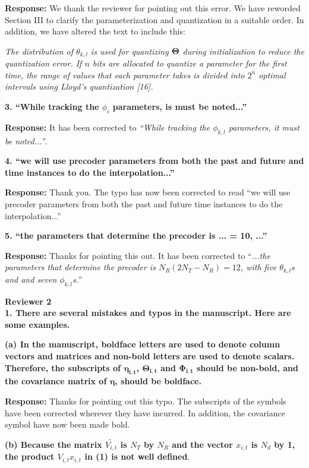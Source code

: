 \documentclass[12pt]{letter}
\begin{document}
\textbf{Response:} We thank the reviewer for pointing out this
error. We have reworded Section III to clarify the parameterization and quantization
in a suitable order. In addition, we have altered the text to include this:

\emph{The distribution of $\theta_{k,l}$ is used for
quantizing $\bf{\Theta}$ during initialization to reduce the
quantization error.  If $n$ bits are allocated to quantize a
parameter for the first time, the range of values that each parameter
takes is divided into $2^n$ optimal intervals using Lloyd's
quantization [16].}

\textbf{3. ``While tracking the $\phi_i$ parameters, is must be noted...''}

\textbf{Response:} It has been corrected to \emph{``While tracking the $\phi_{k,l}$ parameters, it must be noted...''}.

\textbf{4. ``we will use precoder parameters from both the past and future and
time instances to do the interpolation...''}

\textbf{Response:} Thank you. The typo has now been corrected to read
``we will use precoder parameters from both the past and future time instances to do the interpolation...''

\textbf{5. ``the parameters that determine the precoder is ...  = 10, ...''}

\textbf{Response:} Thanks for pointing this out. It has been corrected to ``\emph{...the parameters that determine the precoder is
$N_{R}(2N_{T} - N_R) = 12$, with five $\theta_{k,l}$s and and seven
$\phi_{k,l}$s.}''

\textbf{Reviewer 2}\\

\textbf{1. There are several mistakes and typos in the manuscript. Here are some examples.}

\textbf{(a) In the manuscript, boldface letters are used to denote column vectors and matrices and non-bold letters are used to denote scalars. Therefore, the subscripts of $\boldsymbol{\eta_{i,t}}$, $\boldsymbol{\Theta_{i,t}}$ and $\boldsymbol{\Phi_{i,t}}$ should be non-bold, and the covariance matrix of $\boldsymbol{\eta}$, should be boldface.}

\textbf{Response:} Thanks for pointing out this typo. The subscripts
of the symbols have been corrected wherever they have incurred. In addition,
the covariance symbol have now been made bold.

\textbf{(b) Because the matrix $\tilde{V_{i,t}}$ is $N_T$ by $N_R$ and
  the vector $x_{i,t}$ is $N_d$ by 1, the product $V_{i,t}x_{i,t}$ in
  (1) is not well defined}.
\end{document}
